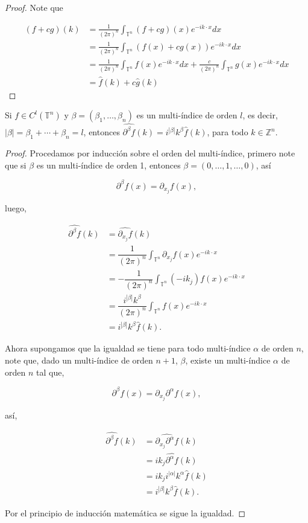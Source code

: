 \documentclass[12pt]{article}
\newcommand\T{\mathbb{T}}
\renewcommand{\hat}{\widehat}
\begin{document}
\begin{proof}
Note que

$$
\begin{aligned}
(f+c g)(k) & =\frac{1}{(2\pi)^n}\int_{\T^n}(f+cg)(x) e^{-i k \cdot x} d x \\
& =\frac{1}{(2\pi)^n}\int_{\T^n}(f(x)+c g(x)) e^{-i k \cdot x} d x \\
& =\frac{1}{(2\pi)^n}\int_{\T^n} f(x) e^{-i k \cdot x} d x+\frac{c}{(2\pi)^n} \int_{\T^n} g(x) e^{-i k \cdot x} d x \\
& =\hat{f}(k)+c\hat{g}(k)
\end{aligned}
$$
\end{proof}

\begin{theorem}\label{derivadacacorra}
Si $f \in C^l\left(\mathbb{T}^n\right)$ y $\beta=\left(\beta_1, \ldots, \beta_n\right)$ es un multi-índice de orden $l$, es decir, $|\beta|=\beta_1+\cdots+\beta_n=l$, entonces $\widehat{\partial^\beta f}(k)=i^{|\beta|} k^\beta \widehat{f}(k)$, para todo $k \in \mathbb{Z}^n$.
\end{theorem}

\begin{proof}
Procedamos  por inducción sobre el orden del multi-índice, primero note que si $\beta$ es un multi-índice de orden 1, entonces $\beta=(0,\ldots,1,\ldots,0)$, así

$$\partial^{\beta}f(x)=\partial_{x_j}f(x),$$

luego,

\begin{align*}
    \widehat{\partial^{\beta}f}(k)&=\widehat{\partial_{x_j}f}(k)\\
    &=\dfrac{1}{(2\pi)^n}\int_{\T^n}\partial_{x_j}f(x)e^{-ik\cdot x}\\
    &=-\dfrac{1}{(2\pi)^n}\int_{\T^n}(-ik_j)f(x)e^{-ik\cdot x}\\
    &=\dfrac{i^{|\beta|}k^{\beta}}{(2\pi)^n}\int_{\T^n}f(x)e^{-ik\cdot x}\\
    &=i^{|\beta|}k^{\beta}\hat{f}(k)
.\end{align*}

Ahora supongamos que la igualdad se tiene para todo multi-índice $\alpha$ de orden $n$, note que, dado un multi-índice de orden $n+1$, $\beta$, existe un multi-índice $\alpha$ de orden $n$ tal que,

$$\partial^{\beta}f(x)=\partial_{x_j}\partial^{\alpha}f(x),$$

así,

\begin{align*}
    \widehat{\partial^{\beta}f}(k)&=\widehat{\partial_{x_j}\partial^{\alpha}f}(k)\\
    &=ik_j\widehat{\partial^{\alpha}f}(k)\\
    &=ik_ji^{|\alpha|}k^{\alpha}\hat{f}(k)\\
    &=i^{|\beta|}k^{\beta}\hat{f}(k)
.\end{align*}

Por el principio de inducción matemática se sigue la igualdad.

\end{proof}
\end{document}
